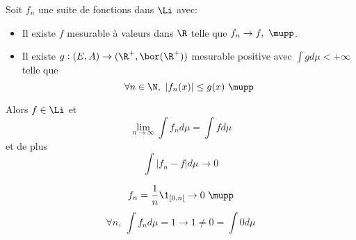 \begin{theorem}
	Soit $f_n$ une suite de fonctions dans $\Li$ avec:
	\begin{itemize}
		\item Il existe $f$ mesurable à valeurs dans $\R$ telle que $f_n \to f, \ \mupp$.
		\item Il existe $g : (E,A) \to (\R^+, \bor(\R^+))$ mesurable positive avec $\int g d\mu < +\infty$ telle que
		      $$\forall n \in\N,\ |f_n(x)| \leq g(x)\ \mupp$$
	\end{itemize}

	Alors $f \in \Li$ et
	$$\lim_{n\to \infty} \int f_n d\mu= \int f d \mu$$
	et de plus
	$$ \int |f_n - f | d \mu \to 0 $$
\end{theorem}


\begin{example}
	$$f_n =\frac{1}{n} \1_{[0,n[} \to 0 \ \mupp$$
	$$ \forall n, \ \int f_n d\mu = 1 \to 1 \neq 0 = \int 0 d\mu$$
\end{example}
